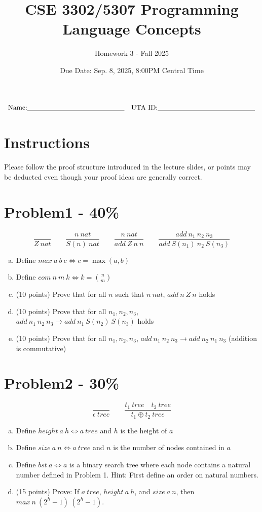 \documentclass{article}
\newcommand{\answerboxbig}{
    \vspace{20cm} %
}
\newcommand{\studentinfo}{
    $$\begin{array}{cc}
        \noindent \text{Name:} \underline{\hspace{5cm}} &
            \text{UTA ID:} \underline{\hspace{5cm}}\\
    \end{array}$$
}
\begin{document}
\title{CSE 3302/5307 Programming Language Concepts}
\author{Homework 3 - Fall 2025}
\date{Due Date: Sep. 8, 2025, 8:00PM Central Time}
\maketitle
\thispagestyle{fancy}

\studentinfo

\section*{Instructions}
Please follow the proof structure introduced in the lecture slides, or points may be deducted even though your proof ideas are generally correct.

\section*{Problem1 - 40\%}
\fontsize{12pt}{0}

\[
  \frac{}{Z\ nat}
  \qquad
  \frac{n\ nat}{S(n)\ nat}
  \qquad
  \frac{n\ nat}{add\ Z\ n\ n}
  \qquad
  \frac{add\ n_1\ n_2\ n_3}{add\ S(n_1)\ n_2\ S(n_3)}
\]
\begin{enumerate}[(a)]
  \item Define $max\ a\ b\ c \iff c=\max(a,b)$
  \item Define $com\ n\ m\ k \iff k = {n\choose m}$
  \item (10 points) Prove that for all $n$ such that $n\ nat$, $add\ n\ Z\ n$ holds
  \item (10 points) Prove that for all $n_1,n_2,n_3$, $add\ n_1\ n_2\ n_3 \to add\ n_1\ S(n_2)\ S(n_3)$ holds
  \item (10 points) Prove that for all $n_1,n_2,n_3$, $add\ n_1\ n_2\ n_3 \to add\ n_2\ n_1\ n_3$ (addition is commutative)
\end{enumerate}

\answerboxbig

\section*{Problem2 - 30\%}

\[
  \frac{}{\epsilon\ tree}
  \qquad
  \frac{t_1\ tree \quad t_2\ tree}{t_1\oplus t_2\ tree}
\]
\begin{enumerate}[(a)]
  \item Define $height\ a\ h \iff a\ tree$ and $h$ is the height of $a$
  \item Define $size\ a\ n \iff a\ tree$ and $n$ is the number of nodes contained in $a$
  \item Define $bst\ a \iff a$ is a binary search tree where each node contains a natural number defined in Problem 1.  Hint: First define an order on natural numbers.
  \item (15 points) Prove: If $a\ tree$, $height\ a\ h$, and $size\ a\ n$, then $max\ n\ (2^h-1)\ (2^h-1)$.
\end{enumerate}
\end{document}
